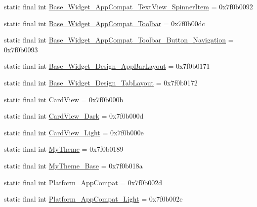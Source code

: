 \begin{CompactItemize}
\item 
static final int \hyperlink{classandroid_1_1support_1_1graphics_1_1drawable_1_1_r_1_1style_b26b20f43dc81584950961e91b45de6b}{Base\_\-Widget\_\-AppCompat\_\-TextView\_\-SpinnerItem} = 0x7f0b0092
\item 
static final int \hyperlink{classandroid_1_1support_1_1graphics_1_1drawable_1_1_r_1_1style_9b097d7ae3ad569e8a306566af603a2a}{Base\_\-Widget\_\-AppCompat\_\-Toolbar} = 0x7f0b00dc
\item 
static final int \hyperlink{classandroid_1_1support_1_1graphics_1_1drawable_1_1_r_1_1style_e6525f7fc7bc2dd95a0221d284a749b7}{Base\_\-Widget\_\-AppCompat\_\-Toolbar\_\-Button\_\-Navigation} = 0x7f0b0093
\item 
static final int \hyperlink{classandroid_1_1support_1_1graphics_1_1drawable_1_1_r_1_1style_757663cf1f3e1fbcf797f9b8733e5dcd}{Base\_\-Widget\_\-Design\_\-AppBarLayout} = 0x7f0b0171
\item 
static final int \hyperlink{classandroid_1_1support_1_1graphics_1_1drawable_1_1_r_1_1style_a3bd41730a836725b6feb85c1f5b2c92}{Base\_\-Widget\_\-Design\_\-TabLayout} = 0x7f0b0172
\item 
static final int \hyperlink{classandroid_1_1support_1_1graphics_1_1drawable_1_1_r_1_1style_5455965016394d99f0522cb3ae6e8f62}{CardView} = 0x7f0b000b
\item 
static final int \hyperlink{classandroid_1_1support_1_1graphics_1_1drawable_1_1_r_1_1style_ee6e1dcf49b947446d12db4359b07826}{CardView\_\-Dark} = 0x7f0b000d
\item 
static final int \hyperlink{classandroid_1_1support_1_1graphics_1_1drawable_1_1_r_1_1style_d2d02a6928fb88f16815c1caa6fdb625}{CardView\_\-Light} = 0x7f0b000e
\item 
static final int \hyperlink{classandroid_1_1support_1_1graphics_1_1drawable_1_1_r_1_1style_9b2a832ac2b1cec7466567613a22274c}{MyTheme} = 0x7f0b0189
\item 
static final int \hyperlink{classandroid_1_1support_1_1graphics_1_1drawable_1_1_r_1_1style_62f623fc4382c26339728dd6e01855d0}{MyTheme\_\-Base} = 0x7f0b018a
\item 
static final int \hyperlink{classandroid_1_1support_1_1graphics_1_1drawable_1_1_r_1_1style_dd07f409636874a9dc51faf9d0dba12d}{Platform\_\-AppCompat} = 0x7f0b002d
\item 
static final int \hyperlink{classandroid_1_1support_1_1graphics_1_1drawable_1_1_r_1_1style_7005e60af7c4967b810dcb4de62e6714}{Platform\_\-AppCompat\_\-Light} = 0x7f0b002e
\item 

\end{CompactItemize}
